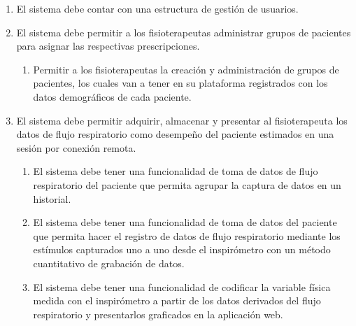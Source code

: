 \documentclass[12pt]{article}
\begin{document}
\begin{enumerate}[start=1,label={\bfseries RF0\arabic*.}]
            


 
    \item El sistema debe contar con una estructura de gestión de usuarios.
    \item El sistema debe permitir a los fisioterapeutas administrar grupos de pacientes para asignar las respectivas prescripciones.
    \label{RF10}
        \begin{enumerate}[label*=\arabic*.]
            \item Permitir a los fisioterapeutas la creación y administración de grupos de pacientes, los cuales van a tener en su plataforma registrados con los datos demográficos de cada paciente.
            
        \end{enumerate}
        
  
            

         
    
 
    
    
    \item El sistema debe permitir adquirir, almacenar y presentar al fisioterapeuta los datos de flujo respiratorio  como desempeño del paciente estimados en una sesión por conexión remota.
    
     \label{RF12}
            \begin{enumerate}[label*=\arabic*.]
                
                \item El sistema debe tener una funcionalidad de toma de datos de flujo respiratorio del paciente que permita agrupar la captura de datos en un historial.
                
                \item El sistema debe tener una funcionalidad de toma de datos del paciente que permita hacer el registro de datos de flujo respiratorio mediante los estímulos capturados uno a uno desde el inspirómetro con un método cuantitativo de grabación de datos.  %
                
                \item El sistema debe tener una funcionalidad de codificar la variable física medida con el inspirómetro a partir de los datos derivados del flujo respiratorio y presentarlos graficados en la aplicación web. %
            

\end{enumerate}
\end{enumerate}
\end{document}
